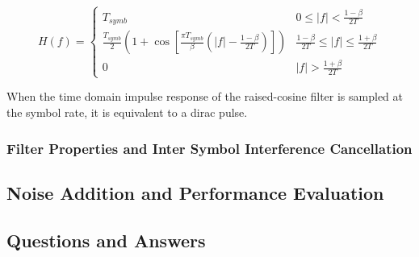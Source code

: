 \begin{equation}
	H(f) = \begin{cases}
		T_{symb} & 0 \le |f| < \frac{1-\beta}{2T} \\
		\frac{T_{symb}}{2} \left(1 + \cos\left[\frac{\pi T_{symb}}{\beta}\left(|f| - \frac{1-\beta}{2T}\right)\right]\right) & \frac{1-\beta}{2T} \le |f| \le \frac{1+\beta}{2T} \\
		0 & |f| > \frac{1+\beta}{2T}
	\end{cases}
\end{equation}

When the time domain impulse response of the raised-cosine filter is sampled at the symbol rate, it is equivalent to a dirac pulse.

\subsubsection{Filter Properties and Inter Symbol Interference Cancellation}
\subsection{Noise Addition and Performance Evaluation}
\subsection{Questions and Answers}